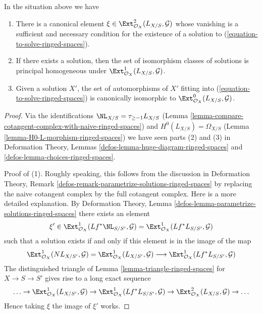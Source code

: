 \begin{lemma}
\label{lemma-find-obstruction-ringed-spaces}
In the situation above we have
\begin{enumerate}
\item There is a canonical element
$\xi \in \Ext^2_{\mathcal{O}_X}(L_{X/S}, \mathcal{G})$
whose vanishing is a sufficient and necessary condition for the existence
of a solution to (\ref{equation-to-solve-ringed-spaces}).
\item If there exists a solution, then the set of
isomorphism classes of solutions is principal homogeneous under
$\Ext^1_{\mathcal{O}_X}(L_{X/S}, \mathcal{G})$.
\item Given a solution $X'$, the set of automorphisms of $X'$
fitting into (\ref{equation-to-solve-ringed-spaces}) is canonically isomorphic
to $\Ext^0_{\mathcal{O}_X}(L_{X/S}, \mathcal{G})$.
\end{enumerate}
\end{lemma}

\begin{proof}
Via the identifications $\NL_{X/S} = \tau_{\geq -1}L_{X/S}$
(Lemma \ref{lemma-compare-cotangent-complex-with-naive-ringed-spaces})
and
$H^0(L_{X/S}) = \Omega_{X/S}$
(Lemma \ref{lemma-H0-L-morphism-ringed-spaces})
we have seen parts (2) and (3) in
Deformation Theory, Lemmas \ref{defos-lemma-huge-diagram-ringed-spaces} and
\ref{defos-lemma-choices-ringed-spaces}.

\medskip\noindent
Proof of (1). Roughly speaking, this follows from the discussion in
Deformation Theory, Remark
\ref{defos-remark-parametrize-solutions-ringed-spaces}
by replacing the naive cotangent complex by the full cotangent complex.
Here is a more detailed explanation. By
Deformation Theory, Lemma \ref{defos-lemma-parametrize-solutions-ringed-spaces}
there exists an element
$$
\xi' \in
\Ext^1_{\mathcal{O}_X}(Lf^*\NL_{S/S'}, \mathcal{G}) =
\Ext^1_{\mathcal{O}_X}(Lf^*L_{S/S'}, \mathcal{G})
$$
such that a solution exists if and only if this element is in
the image of the map
$$
\Ext^1_{\mathcal{O}_X}(NL_{X/S'}, \mathcal{G}) =
\Ext^1_{\mathcal{O}_X}(L_{X/S'}, \mathcal{G})
\longrightarrow
\Ext^1_{\mathcal{O}_X}(Lf^*L_{S/S'}, \mathcal{G})
$$
The distinguished triangle of Lemma \ref{lemma-triangle-ringed-spaces}
for $X \to S \to S'$ gives rise to a long exact sequence
$$
\ldots \to
\Ext^1_{\mathcal{O}_X}(L_{X/S'}, \mathcal{G}) \to
\Ext^1_{\mathcal{O}_X}(Lf^*L_{S/S'}, \mathcal{G}) \to
\Ext^2_{\mathcal{O}_X}(L_{X/S}, \mathcal{G}) \to \ldots
$$
Hence taking $\xi$ the image of $\xi'$ works.
\end{proof}











